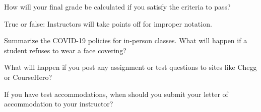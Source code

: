 \documentclass{exam}
\numberwithin{equation}{section} %
\numberwithin{figure}{section} %
\numberwithin{table}{section} %
\begin{document}
\begin{questions}
\begin{solution}[\stretch{2}]
\end{solution}

\question How will your final grade be calculated if you satisfy the criteria to pass?
\begin{solution}[\stretch{1}]

\end{solution}

\question True or false: Instructors will take points off for improper notation.
\begin{solution}[\stretch{1}]

\end{solution}

\newpage

\question Summarize the COVID-19 policies for in-person classes. What will happen if a student refuses to wear a face covering?
\begin{solution}[\stretch{2}]

\end{solution}

\question What will happen if you post any assignment or test questions to sites like Chegg or CourseHero?
\begin{solution}[\stretch{1}]

\end{solution}

\question If you have test accommodations, when should you submit your letter of accommodation to your instructor?
\begin{solution}[\stretch{1}]

\end{solution}

\end{questions}
\end{document}
